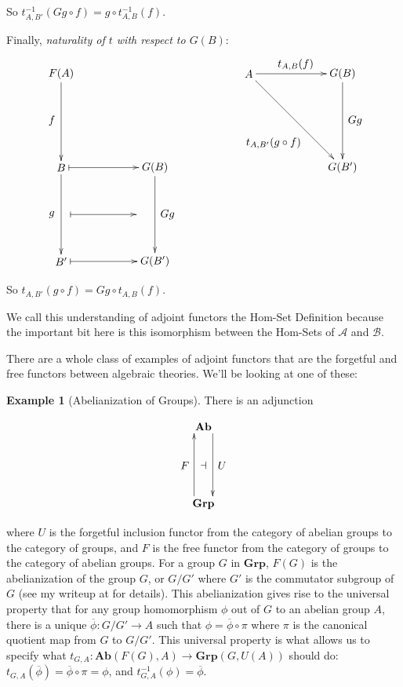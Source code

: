 \documentclass[11pt]{article}
\theoremstyle{definition}
\theoremstyle{definition}
\newtheorem*{ex}{Example}
\theoremstyle{plain}
\theoremstyle{plain}
\theoremstyle{plain}
\begin{document}
So $t^{-1}_{A,B'}(Gg \circ f) = g \circ t^{-1}_{A,B}(f)$.

Finally, \emph{naturality of $t$ with respect to $G(B)$}:

\begin{equation*}
\begin{xy}
(0, 0)*+{F(A)}="fa"; (0, -30)*+{B}="b"; (30, -30)*+{G(B)}="gb"; (0, -60)*+{B'}="bp"; (30, -60)*+{G(B')}="gbp";
(60, 0)*+{A}="at"; (90, 0)*+{G(B)}="gbt"; (90, -30)*+{G(B')}="gbpt";
{\ar "fa";"b"}?*!/^3mm/{f}; {\ar "gb";"gbp"}?*!/_4mm/{Gg}; {\ar "b";"bp"}?*!/^3mm/{g};
{\ar@{|->} "b";"gb"}; {\ar@{|->} "bp";"gbp"}; {\ar@{|->} (3, -45);(24, -45)};
{\ar "at";"gbt"}?*!/_3mm/{t_{A,B}(f)};
{\ar "gbt";"gbpt"}?*!/_4mm/{Gg};
{\ar "at";"gbpt"}?*!/^10mm/{t_{A,B'}(g \circ f)};
\end{xy}
\end{equation*}

So $t_{A,B'}(g \circ f) = Gg \circ t_{A,B}(f)$.

We call this understanding of adjoint functors the Hom-Set Definition because the important bit here is this isomorphism between the Hom-Sets of $\mathscr{A}$ and $\mathscr{B}$.
 
There are a whole class of examples of adjoint functors that are the forgetful and free functors between algebraic theories. We'll be looking at one of these:
 
 \begin{ex}[Abelianization of Groups]
 There is an adjunction
 
 \begin{equation*}
 \begin{xy}
 (0,0)*+{\textbf{Ab}}="ab"; (0,-25)*+{\textbf{Grp}}="grp";
 {\ar@<2.ex> "ab";"grp"}?*!/_3mm/{U}?*!/^3mm/{\dashv};
 {\ar@<2.ex> "grp";"ab"}?*!/_3mm/{F};
 \end{xy}
 \end{equation*}
 \end{ex}
 
 where $U$ is the forgetful inclusion functor from the category of abelian groups to the category of groups, and $F$ is the free functor from the category of groups to the category of abelian groups. For a group $G$ in $\textbf{Grp}$, $F(G)$ is the abelianization of the group $G$, or $G/G'$ where $G'$ is the commutator subgroup of $G$ (see my writeup at \cite{liu_abelianization_2018} for details). This abelianization gives rise to the universal property that for any group homomorphism $\phi$ out of $G$ to an abelian group $A$, there is a unique $\overline{\phi}: G/G' \to A$ such that $\phi = \overline{\phi} \circ \pi$ where $\pi$ is the canonical quotient map from $G$ to $G/G'$. This universal property is what allows us to specify what $t_{G,A}: \textbf{Ab}(F(G), A) \to \textbf{Grp}(G, U(A))$ should do: $t_{G,A}(\overline{\phi}) = \overline{\phi} \circ \pi = \phi$, and $t^{-1}_{G,A}(\phi) = \overline{\phi}$.
 
\end{document}
